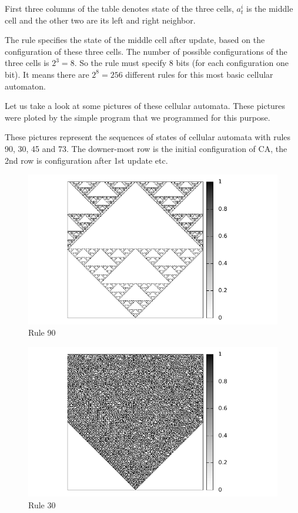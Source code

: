 
First three columns of the table denotes state of the three cells, $a_t^i$ is the middle cell and the other two are its left and right neighbor.

The rule specifies the state of the middle cell after update, based on the configuration of these three cells.
The number of possible configurations of the three cells is $2^3 = 8$.
So the rule must specify 8 bits (for each configuration one bit).
It means there are $2^8 = 256$ different rules for this most basic cellular automaton.

Let us take a look at some pictures of these cellular automata. These pictures were ploted by the simple program that we programmed for this purpose.

These pictures represent the sequences of states of cellular automata with rules 90, 30, 45 and 73.
The downer-most row is the initial configuration of CA, 
the 2nd row is configuration after 1st update etc.

\begin{figure}
 \centering
 \includegraphics[width=1\textwidth]{./img/rule90}
 \caption{Rule 90}
 \label{koberec}
\end{figure}

\begin{figure}
 \centering
 \includegraphics[width=1\textwidth]{./img/rule30}
 \caption{Rule 30}
\end{figure}

